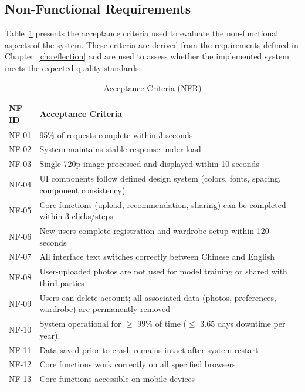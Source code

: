 \newpage
\subsection{Non-Functional Requirements}
Table~\ref{tab:nfr_acceptance} presents the acceptance criteria used to evaluate the non-functional aspects of the system. These criteria are derived from the requirements defined in Chapter~\ref{ch:reflection} and are used to assess whether the implemented system meets the expected quality standards.

\begin{table}[H]
\centering
\small
\caption{Acceptance Criteria (NFR)}
\label{tab:nfr_acceptance}
\renewcommand{\arraystretch}{2}
\begin{tabular}{p{1.6cm}p{13.2cm}}
\toprule
\textbf{NF ID} & \textbf{Acceptance Criteria} \\
\midrule
NF-01 & 95\% of requests complete within 3 seconds \\
NF-02 & System maintains stable response under load \\
NF-03 & Single 720p image processed and displayed within 10 seconds \\
NF-04 & UI components follow defined design system (colors, fonts, spacing, component consistency) \\
NF-05 & Core functions (upload, recommendation, sharing) can be completed within 3 clicks/steps \\
NF-06 & New users complete registration and wardrobe setup within 120 seconds \\
NF-07 & All interface text switches correctly between Chinese and English \\
NF-08 & User-uploaded photos are not used for model training or shared with third parties \\
NF-09 & Users can delete account; all associated data (photos, preferences, wardrobe) are permanently removed \\
NF-10 & System operational for $\geq$ 99\% of time ($\leq$ 3.65 days downtime per year). \\
NF-11 & Data saved prior to crash remains intact after system restart \\
NF-12 & Core functions work correctly on all specified browsers \\
NF-13 & Core functions accessible on mobile devices \\
\bottomrule
\end{tabular}
\end{table}

